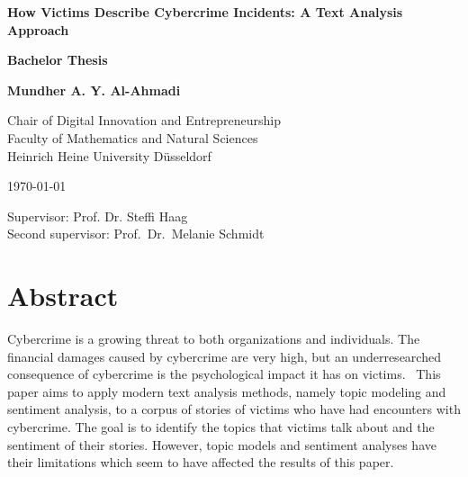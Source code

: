 \documentclass[12pt,english,titlepage,a4paper]{article}
\begin{document}
\begin{titlepage}
\begin{center}

\textbf{\LARGE How Victims Describe Cybercrime Incidents: A Text Analysis Approach}

\bigskip\bigskip
\textbf{Bachelor Thesis}

\bigskip
\textbf{Mundher A. Y. Al-Ahmadi}



\vfill
Chair of Digital Innovation and Entrepreneurship\\ 
Faculty of Mathematics and Natural Sciences \\ 
Heinrich Heine University D\"usseldorf

\bigskip
\today

\bigskip
Supervisor: Prof. Dr. Steffi Haag \\
Second supervisor: Prof.\ Dr.\ Melanie Schmidt

\end{center}
\end{titlepage}

\thispagestyle{empty}\mbox{}\pagebreak
\setcounter{page}{0}





\tableofcontents
\pagebreak

\section*{Abstract}
Cybercrime is a growing threat to both organizations and individuals. The financial damages caused by cybercrime are very high, but an underresearched consequence of cybercrime is the psychological impact it has on victims.~\cite{horesearch} This paper aims to apply modern text analysis methods, namely topic modeling and sentiment analysis, to a corpus of stories of victims who have had encounters with cybercrime. The goal is to identify the topics that victims talk about and the sentiment of their stories. However, topic models and sentiment analyses have their limitations which seem to have affected the results of this paper.
\end{document}

